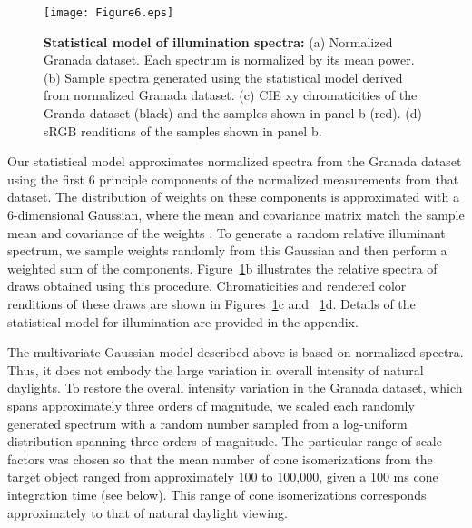 \documentclass{jov}
\begin{document}
\begin{figure}
\centering
\texttt{[image: Figure6.eps]}
    \caption{{\bf Statistical model of illumination spectra:} (a) Normalized Granada dataset. Each spectrum is normalized by its mean power. (b) Sample spectra generated using the statistical model derived from normalized Granada dataset. (c) CIE xy chromaticities of the Granda dataset (black) and the samples shown in panel b (red). (d) sRGB renditions of the samples shown in panel b.}
\label{fig:illuminant}
\end{figure}

Our statistical model approximates normalized spectra from the Granada dataset using the first 6 principle components of the normalized measurements from that dataset.
The distribution of weights on these components is approximated with a 6-dimensional Gaussian, where the mean and covariance matrix match the sample mean and covariance of the weights \cite{BrainardFreeman}. 
To generate a random relative illuminant spectrum, we sample weights randomly from this Gaussian and then perform a weighted sum of the components.
Figure~\ref{fig:illuminant}b illustrates the relative spectra of draws obtained using this procedure.
Chromaticities and rendered color renditions of these draws are shown in Figures~\ref{fig:illuminant}c and ~\ref{fig:illuminant}d.
Details of the statistical model for illumination are provided in the appendix.

The multivariate Gaussian model described above is based on normalized spectra. 
Thus, it does not embody the large variation in overall intensity of natural daylights.
To restore the overall intensity variation in the Granada dataset, which spans approximately three orders of magnitude, we scaled each randomly generated spectrum with a random number sampled from a log-uniform distribution spanning three orders of magnitude.
The particular range of scale factors was chosen so that the mean number of cone isomerizations from the target object ranged from approximately 100 to 100,000, given a 100 ms cone integration time (see below).
This range of cone isomerizations corresponds approximately to that of natural daylight viewing.
\end{document}
